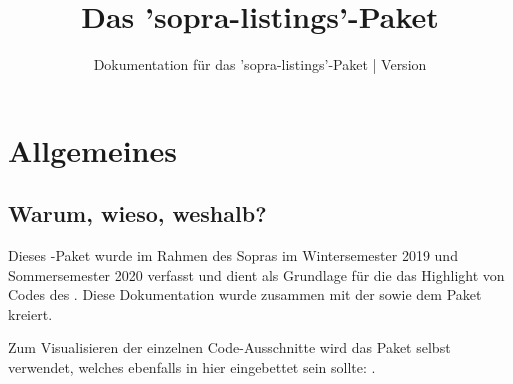 \documentclass{sopra-base}
\title{Das 'sopra-listings'-Paket}
\subtitle[Dokumentation für das 'sopra-listings'-Paket]{Dokumentation für das 'sopra-listings'-Paket | Version \thesolversion}
\begin{document}
    \maketitle%
%
%

%
%
%
%

\section{Allgemeines}
\subsection{Warum, wieso, weshalb?}
    Dieses \LaTeXe-Paket wurde im Rahmen des Sopras im
    Wintersemester 2019 und Sommersemester 2020 verfasst und dient als
    Grundlage für die das Highlight von Codes
    des . Diese Dokumentation wurde zusammen mit der
     sowie dem Paket  kreiert.\par
    Zum Visualisieren der einzelnen Code-Ausschnitte wird das Paket selbst verwendet, welches ebenfalls in hier eingebettet sein sollte: . 
\end{document}
